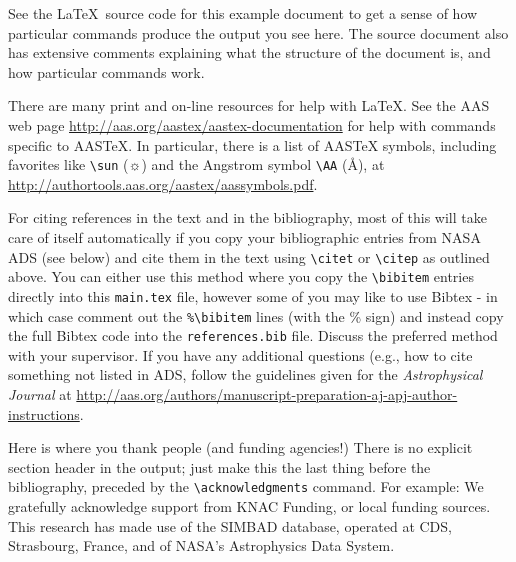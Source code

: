 \documentclass{knac}
\begin{document}
See the \LaTeX\ source code for this example document to get a sense
of how particular commands produce the output you see here.  The
source document also has extensive comments explaining what the
structure of the document is, and how particular commands work. 

There are many print and on-line resources for help with \LaTeX.  See
the AAS web page \url{http://aas.org/aastex/aastex-documentation} for
help with commands specific to AASTeX.  In particular, there is a list
of AASTeX symbols, including favorites like \verb|\sun| ($\sun$) and
the Angstrom symbol \verb|\AA| (\AA), at
\url{http://authortools.aas.org/aastex/aassymbols.pdf}.

For citing references in the text and in the bibliography, most of
this will take care of itself automatically if you copy your
bibliographic entries from NASA ADS (see below) and cite them in the text using \verb|\citet| or \verb|\citep| as outlined above. You can either use this method where you copy the \verb|\bibitem| entries directly into this \verb|main.tex| file, however some of you may like to use Bibtex - in which case comment out the \verb|%\bibitem| lines (with the \% sign) and instead copy the full Bibtex code into the \verb|references.bib| file. Discuss the preferred method with your supervisor. If you have any
additional questions (e.g., how to cite something not listed in ADS,
follow the guidelines given for the {\it Astrophysical Journal}\/ at
\url{http://aas.org/authors/manuscript-preparation-aj-apj-author-instructions}. 
  

\acknowledgments

Here is where you thank people (and funding agencies!)  There is no
explicit section header in the output; just make this the last thing
before the bibliography, preceded by the \verb|\acknowledgments| 
command. For example:  We gratefully acknowledge support from KNAC Funding, or local funding sources. This research has
made use of the SIMBAD database, operated at CDS, Strasbourg, France, and of NASA's Astrophysics Data System. 



\end{document}
